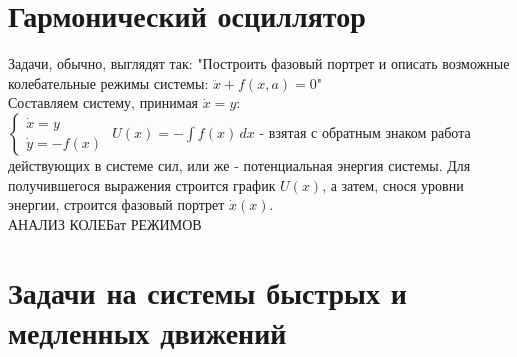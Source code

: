 \newcommand{\colontitulAutors}{astronom\_v\_cube et}
\newcommand{\colontitulYear}{2022}
\newcommand{\colontitulEducationalSubject}{Алгоритмы решения задач по теории колебаний}
\newcommand{\colontitulTeacher}{LaTex}




	\small
	\begin{multicols*}{2}

		\section{Гармонический осциллятор}

		Задачи, обычно, выглядят так:
		"Построить фазовый портрет и описать возможные колебательные режимы системы: $ \ddot{x} + f(x, a) = 0 $"\\
		Составляем систему, принимая $\dot{x} = y$:\\
		$\begin{cases}
			\dot{x} = y \\
			\dot{y} = -f(x)
		\end{cases} $
		$U(x) = -\int f(x) \,dx $ - взятая с обратным знаком работа действующих в системе сил, или же - потенциальная энергия системы. Для  получившегося выражения строится график $U(x)$, а затем, снося уровни энергии, строится фазовый портрет $\dot{x}(x)$.\\
		АНАЛИЗ КОЛЕБат РЕЖИМОВ


		\section{Задачи на системы быстрых и медленных движений}


	\end{multicols*}
